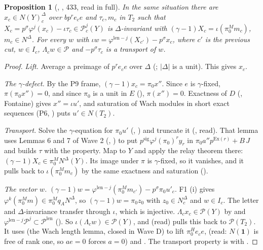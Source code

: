 \documentclass[11pt]{article}
\newcommand{\NN}{N^{\Delta}}
\newcommand{\Pp}{\mathcal P}
\newtheorem{prop}[lemma]{Proposition}
\theoremstyle{definition}
\theoremstyle{remark}
\begin{document}
\begin{prop}[, , 433, read in full]
In the same situation there are $x_c\in N(Y)^\Delta_c$ over $bp^re_ce$ and $\tau_c,m_c$ in $T_2$ such that $X_c=p^\sigma\varphi^j(x_c)-\iota\tau_c\in\Pp^j_c(Y)$ is $\Delta$-invariant with $(\gamma-1)X_c=\iota(\pi_0^Mm_c)$, $m_c\in\NN$. For every $w$ with $\iota w=\varphi^{\mathrm{len}-j}(X_{c'})-p^\sigma x_c$, where $c'$ is the previous cut, $w\in I_c$, $\Lambda_cw\in\Pp$ and $-p^\sigma\tau_c$ is a transport of $w$.
\end{prop}
\begin{proof}
\emph{Lift.} Average a preimage of $p^re_ce$ over $\Delta$ (; $|\Delta|$ is a unit). This gives $x_c$.

\emph{The $\gamma$-defect.} By the P9 frame, $(\gamma-1)x_c=\pi_0x''$. Since $e$ is $\gamma$-fixed, $\pi(\pi_0x'')=0$, and since $\pi_0$ is a unit in $E$ (), $\pi(x'')=0$. Exactness of $D$ (, Fontaine) gives $x''=\iota u'$, and saturation of Wach modules in short exact sequences (P6, ) puts $u'\in N(T_2)$.

\emph{Transport.} Solve the $\gamma$-equation for $\pi_0u'$ (, ) and truncate it (, read). That lemma uses Lemmas 6 and 7 of Wave 2 (, ) to put $p^{\mathrm{sig}}\varphi^j(\pi_0)^ry_r$ in $\pi_0a''p^{\mathrm{Ex}(r)}+B\,J$ and builds $\tau$ with the  property. Map to $Y$ and apply the relay theorem there: $(\gamma-1)X_c\in\pi_0^M\NN(Y)$. Its image under $\pi$ is $\gamma$-fixed, so it vanishes, and it pulls back to $\iota(\pi_0^Mm_c)$ by the same exactness and saturation ().

\emph{The vector $w$.} $(\gamma-1)w=\varphi^{\mathrm{len}-j}(\pi_0^Mm_{c'})-p^\sigma\pi_0u'_c$. F1 (i) gives $\varphi^k(\pi_0^Mm)\in\pi_0^Mq_A\NN$, so $(\gamma-1)w=\pi_0z_0$ with $z_0\in\NN_c$ and $w\in I_c$. The letter and $\Delta$-invariance transfer through $\iota$, which is injective. $\Lambda_cx_c\in\Pp(Y)$ by  and $\varphi^{\mathrm{len}-j}\Pp^j\subset\Pp^{\mathrm{len}}$ (). So $\iota(\Lambda_cw)\in\Pp(Y)$, and  (read) pulls this back to $\Pp(T_2)$. It uses  (the Wach length lemma, closed in Wave D) to lift $\pi_0^{H}e_ce$,  (read: $N(\mathbf 1)$ is free of rank one, so $ae=0$ forces $a=0$) and . The transport property is  with .
\end{proof}
\end{document}
